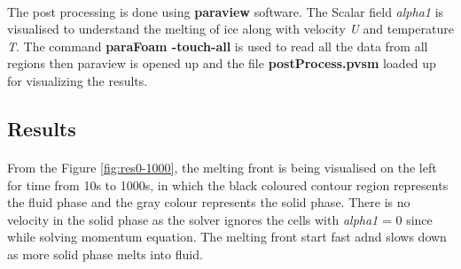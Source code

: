 \documentclass{article}
\begin{document}
    \paragraph*{}
    The post processing is done using \textbf{paraview} software. The Scalar field \textsl{alpha1} is visualised to understand the melting of ice along with velocity \textsl{U} and temperature \textsl{T}. The command \textbf{paraFoam -touch-all} is used to read all the data from all regions then paraview is opened up and the file \textbf{postProcess.pvsm} loaded up for visualizing the results.

    \subsection{Results}
    \paragraph*{}
    From the Figure \ref{fig:res0-1000}, the melting front is being visualised on the left for time from 10s to 1000s, in which the black coloured contour region represents the fluid phase and the gray colour represents the solid phase. There is no velocity in the solid phase as the solver ignores the cells with \textsl{alpha1} = 0 since while solving momentum equation. The melting front start fast adnd slows down as more solid phase melts into fluid. 
    
\end{document}
